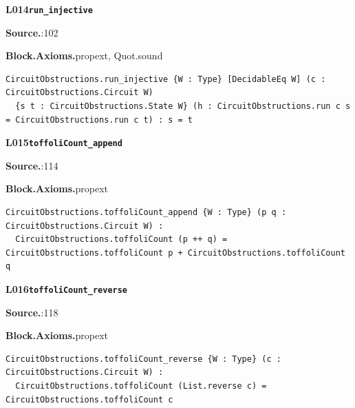 \par\medskip\noindent\begin{minipage}{\textwidth}
{\small\bfseries L014\enspace\texttt{run\_injective}\par}
{\footnotesize\raggedright\textbf{Source.}\enspace{}:102\par
\textbf{Block.}\quad\textbf{Axioms.}\enspace propext, Quot.sound\par}\nopagebreak
\begin{lstlisting}
CircuitObstructions.run_injective {W : Type} [DecidableEq W] (c : CircuitObstructions.Circuit W)
  {s t : CircuitObstructions.State W} (h : CircuitObstructions.run c s = CircuitObstructions.run c t) : s = t
\end{lstlisting}
\end{minipage}\par

\par\medskip\noindent\begin{minipage}{\textwidth}
{\small\bfseries L015\enspace\texttt{toffoliCount\_append}\par}
{\footnotesize\raggedright\textbf{Source.}\enspace{}:114\par
\textbf{Block.}\quad\textbf{Axioms.}\enspace propext\par}\nopagebreak
\begin{lstlisting}
CircuitObstructions.toffoliCount_append {W : Type} (p q : CircuitObstructions.Circuit W) :
  CircuitObstructions.toffoliCount (p ++ q) = CircuitObstructions.toffoliCount p + CircuitObstructions.toffoliCount q
\end{lstlisting}
\end{minipage}\par

\par\medskip\noindent\begin{minipage}{\textwidth}
{\small\bfseries L016\enspace\texttt{toffoliCount\_reverse}\par}
{\footnotesize\raggedright\textbf{Source.}\enspace{}:118\par
\textbf{Block.}\quad\textbf{Axioms.}\enspace propext\par}\nopagebreak
\begin{lstlisting}
CircuitObstructions.toffoliCount_reverse {W : Type} (c : CircuitObstructions.Circuit W) :
  CircuitObstructions.toffoliCount (List.reverse c) = CircuitObstructions.toffoliCount c
\end{lstlisting}
\end{minipage}\par


